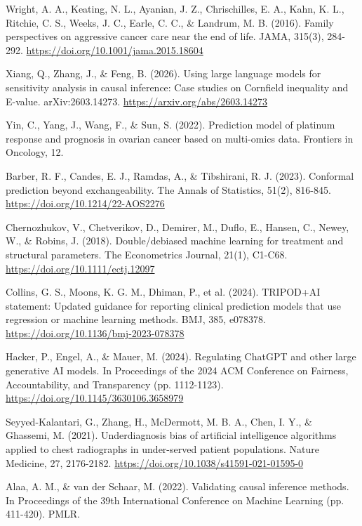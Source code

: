 Wright, A. A., Keating, N. L., Ayanian, J. Z., Chrischilles, E. A., Kahn, K. L., Ritchie, C. S., Weeks, J. C., Earle, C. C., \& Landrum, M. B. (2016). Family perspectives on aggressive cancer care near the end of life. JAMA, 315(3), 284-292. \href{https://jamanetwork.com/journals/jama/fullarticle/2482326}{https://doi.org/10.1001/jama.2015.18604}

Xiang, Q., Zhang, J., \& Feng, B. (2026). Using large language models for sensitivity analysis in causal inference: Case studies on Cornfield inequality and E-value. arXiv:2603.14273. \href{https://arxiv.org/abs/2603.14273}{https://arxiv.org/abs/2603.14273}

Yin, C., Yang, J., Wang, F., \& Sun, S. (2022). Prediction model of platinum response and prognosis in ovarian cancer based on multi-omics data. Frontiers in Oncology, 12.

Barber, R. F., Candes, E. J., Ramdas, A., \& Tibshirani, R. J. (2023). Conformal prediction beyond exchangeability. The Annals of Statistics, 51(2), 816-845. \href{https://doi.org/10.1214/22-AOS2276}{https://doi.org/10.1214/22-AOS2276}

Chernozhukov, V., Chetverikov, D., Demirer, M., Duflo, E., Hansen, C., Newey, W., \& Robins, J. (2018). Double/debiased machine learning for treatment and structural parameters. The Econometrics Journal, 21(1), C1-C68. \href{https://doi.org/10.1111/ectj.12097}{https://doi.org/10.1111/ectj.12097}

Collins, G. S., Moons, K. G. M., Dhiman, P., et al. (2024). TRIPOD+AI statement: Updated guidance for reporting clinical prediction models that use regression or machine learning methods. BMJ, 385, e078378. \href{https://doi.org/10.1136/bmj-2023-078378}{https://doi.org/10.1136/bmj-2023-078378}

Hacker, P., Engel, A., \& Mauer, M. (2024). Regulating ChatGPT and other large generative AI models. In Proceedings of the 2024 ACM Conference on Fairness, Accountability, and Transparency (pp. 1112-1123). \href{https://doi.org/10.1145/3630106.3658979}{https://doi.org/10.1145/3630106.3658979}

Seyyed-Kalantari, G., Zhang, H., McDermott, M. B. A., Chen, I. Y., \& Ghassemi, M. (2021). Underdiagnosis bias of artificial intelligence algorithms applied to chest radiographs in under-served patient populations. Nature Medicine, 27, 2176-2182. \href{https://doi.org/10.1038/s41591-021-01595-0}{https://doi.org/10.1038/s41591-021-01595-0}

Alaa, A. M., \& van der Schaar, M. (2022). Validating causal inference methods. In Proceedings of the 39th International Conference on Machine Learning (pp. 411-420). PMLR.
